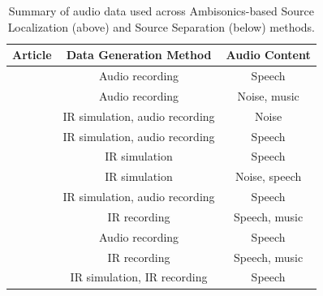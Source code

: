 \begin{table}[ht!]
    \centering
    \footnotesize

	\begin{tabular}{ ccc }
    \toprule
    
    Article &
    Data Generation Method &
    Audio Content\\
    \midrule
    
    \cite{thiergart_localization_2009}
    & Audio recording 
    & Speech\\
    
    \cite{Tervo2009}
    & Audio recording
    & Noise, music\\
    
    \cite{Jarrett2010} 
    & IR simulation, audio recording
    & Noise\\
    
    \cite{Nadiri2014}   
    & IR simulation, audio recording
    & Speech\\
    
    \cite{Moore2015}   
    & IR simulation 
    & Speech\\
    
    \cite{Pavlidi2015}
    & IR simulation 
    & Noise, speech\\
    
    \cite{He2017}   
    & IR simulation, audio recording
    & Speech\\
    
    
    \midrule
    
    \cite{Gunel2008}
    & IR recording
    & Speech, music\\
    
    \cite{Shujau2011} 
    & Audio recording
    & Speech\\
    
    \cite{Riaz2015}
    & IR recording
    & Speech, music\\
    
    \cite{Chen2015}
    & IR simulation, IR recording
    & Speech\\

    \bottomrule
    \end{tabular}
    \caption{Summary of audio data used across Ambisonics-based Source Localization (above) and Source Separation (below) methods.}
    \label{table:evaluationdata}
\end{table}

